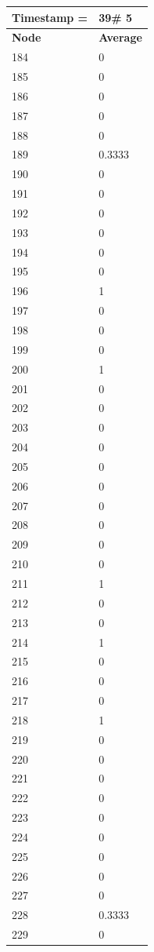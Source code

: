 \begin{tabular}{|l||l|}
\hline
\textbf{Timestamp =} & \textbf{39}\# 5\\\hline
	\textbf{Node} & \textbf{Average} \\ \hline
\hline
	184 & 0 \\ \hline
	185 & 0 \\ \hline
	186 & 0 \\ \hline
	187 & 0 \\ \hline
	188 & 0 \\ \hline
	189 & 0.3333 \\ \hline
	190 & 0 \\ \hline
	191 & 0 \\ \hline
	192 & 0 \\ \hline
	193 & 0 \\ \hline
	194 & 0 \\ \hline
	195 & 0 \\ \hline
	196 & 1 \\ \hline
	197 & 0 \\ \hline
	198 & 0 \\ \hline
	199 & 0 \\ \hline
	200 & 1 \\ \hline
	201 & 0 \\ \hline
	202 & 0 \\ \hline
	203 & 0 \\ \hline
	204 & 0 \\ \hline
	205 & 0 \\ \hline
	206 & 0 \\ \hline
	207 & 0 \\ \hline
	208 & 0 \\ \hline
	209 & 0 \\ \hline
	210 & 0 \\ \hline
	211 & 1 \\ \hline
	212 & 0 \\ \hline
	213 & 0 \\ \hline
	214 & 1 \\ \hline
	215 & 0 \\ \hline
	216 & 0 \\ \hline
	217 & 0 \\ \hline
	218 & 1 \\ \hline
	219 & 0 \\ \hline
	220 & 0 \\ \hline
	221 & 0 \\ \hline
	222 & 0 \\ \hline
	223 & 0 \\ \hline
	224 & 0 \\ \hline
	225 & 0 \\ \hline
	226 & 0 \\ \hline
	227 & 0 \\ \hline
	228 & 0.3333 \\ \hline
	229 & 0 \\ \hline
\end{tabular}
